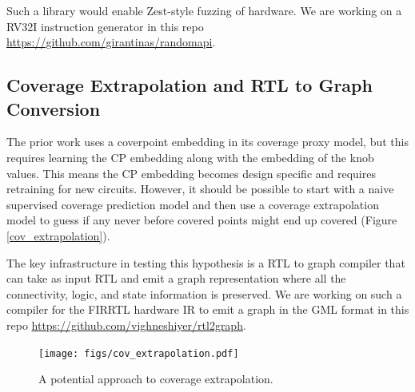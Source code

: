 \documentclass[sigconf,noacm]{acmart}
\begin{document}
Such a library would enable Zest-style fuzzing of hardware.
We are working on a RV32I instruction generator in this repo \url{https://github.com/girantinas/randomapi}.

\subsection{Coverage Extrapolation and RTL to Graph Conversion}

The prior work uses a coverpoint embedding in its coverage proxy model, but this requires learning the CP embedding along with the embedding of the knob values.
This means the CP embedding becomes design specific and requires retraining for new circuits.
However, it should be possible to start with a naive supervised coverage prediction model and then use a coverage extrapolation model to guess if any never before covered points might end up covered (Figure \ref{cov_extrapolation}).

The key infrastructure in testing this hypothesis is a RTL to graph compiler that can take as input RTL and emit a graph representation where all the connectivity, logic, and state information is preserved.
We are working on such a compiler for the FIRRTL hardware IR to emit a graph in the GML format in this repo \url{https://github.com/vighneshiyer/rtl2graph}.

\begin{figure}
  \texttt{[image: figs/cov\_extrapolation.pdf]}
  \caption{A potential approach to coverage extrapolation.}
  \label{fig:cov_extrapolation}
\end{figure}




\appendix
\end{document}
